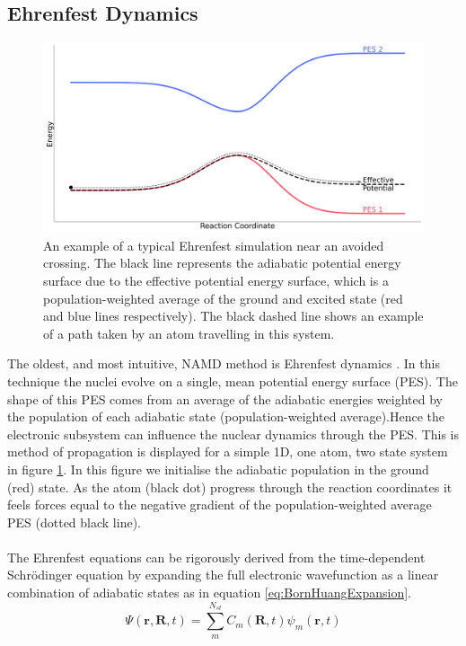 \subsection{Ehrenfest Dynamics}
\begin{figure}[htp]
  \includegraphics[width=\textwidth]{../img/Eh_hop.png}
	\caption{\label{fig:Eh_diag}An example of a typical Ehrenfest simulation near an avoided crossing. The black line represents the adiabatic potential energy surface due to the effective potential energy surface, which is a population-weighted average of the ground and excited state (red and blue lines respectively). The black dashed line shows an example of a path taken by an atom travelling in this system. }
\end{figure}
\noindent The oldest, and most intuitive, NAMD method is Ehrenfest dynamics \cite{Ehrenfest1927}. In this technique the nuclei evolve on a single, mean potential energy surface (PES). The shape of this PES comes from an average of the adiabatic energies weighted by the population of each adiabatic state (population-weighted average).Hence the electronic subsystem can influence the nuclear dynamics through the PES. This is method of propagation is displayed for a simple 1D, one atom, two state system in figure \ref{fig:Eh_diag}. In this figure we initialise the adiabatic population in the ground (red) state. As the atom (black dot) progress through the reaction coordinates it feels forces equal to the negative gradient of the population-weighted average PES (dotted black line).
\\\\
The Ehrenfest equations can be rigorously derived from the time-dependent Schr\"odinger equation by expanding the full electronic wavefunction as a linear combination of adiabatic states as in equation \eqref{eq:BornHuangExpansion}.
\begin{equation}
	\Psi(\mathbf{r}, \mathbf{R}, t) = \sum_{m}^{N_{st}} C_{m}(\mathbf{R}, t) \psi_{m}(\mathbf{r}, t)
	\label{eq:BornHuangExpansion}
\end{equation}
